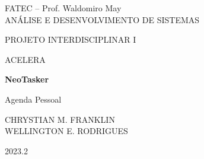 \documentclass[a4paper,12pt]{article}
\begin{document}
\begin{titlingpage}
    \begin{center}
        {\large
            {\Huge
                FATEC -- Prof. Waldomiro May
            }\\
            ANÁLISE E DESENVOLVIMENTO DE SISTEMAS

			\vspace{1cm}
			PROJETO INTERDISCIPLINAR I

			\vspace{1cm}
			ACELERA
			
            \vspace{6cm}
            {\Huge
                \textbf{NeoTasker}
            }

            Agenda Pessoal

            \vspace{2cm}
            CHRYSTIAN M. FRANKLIN \\
            WELLINGTON E. RODRIGUES

            \vspace{7cm}
            2023.2
        }
    \end{center}
\end{titlingpage}
\end{document}
